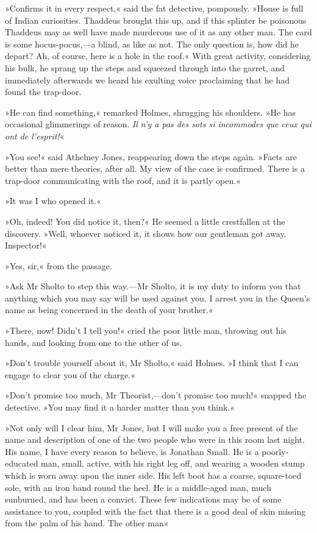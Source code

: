 »Confirms it in every respect,« said the fat detective, pompously. »House is full of Indian curiosities. Thaddeus brought this up, and if this splinter be poisonous Thaddeus may as well have made murderous use of it as any other man. The card is some hocus-pocus,—a blind, as like as not. The only question is, how did he depart? Ah, of course, here is a hole in the roof.« With great activity, considering his bulk, he sprang up the steps and squeezed through into the garret, and immediately afterwards we heard his exulting voice proclaiming that he had found the trap-door.

»He can find something,« remarked Holmes, shrugging his shoulders. »He has occasional glimmerings of reason. \textit{\textfrench{Il n'y a pas des sots si incommodes que ceux qui ont de l'esprit!}}«

»You see!« said Athelney Jones, reappearing down the steps again. »Facts are better than mere theories, after all. My view of the case is confirmed. There is a trap-door communicating with the roof, and it is partly open.«

»It was I who opened it.«

»Oh, indeed! You did notice it, then?« He seemed a little crestfallen at the discovery. »Well, whoever noticed it, it shows how our gentleman got away. Inspector!«

»Yes, sir,« from the passage.

»Ask Mr Sholto to step this way.—Mr Sholto, it is my duty to inform you that anything which you may say will be used against you. I arrest you in the Queen's name as being concerned in the death of your brother.«

»There, now! Didn't I tell you!« cried the poor little man, throwing out his hands, and looking from one to the other of us.

»Don't trouble yourself about it, Mr Sholto,« said Holmes. »I think that I can engage to clear you of the charge.«

»Don't promise too much, Mr Theorist,—don't promise too much!« snapped the detective. »You may find it a harder matter than you think.«

»Not only will I clear him, Mr Jones, but I will make you a free present of the name and description of one of the two people who were in this room last night. His name, I have every reason to believe, is Jonathan Small. He is a poorly-educated man, small, active, with his right leg off, and wearing a wooden stump which is worn away upon the inner side. His left boot has a coarse, square-toed sole, with an iron band round the heel. He is a middle-aged man, much sunburned, and has been a convict. These few indications may be of some assistance to you, coupled with the fact that there is a good deal of skin missing from the palm of his hand. The other man\longdash«

